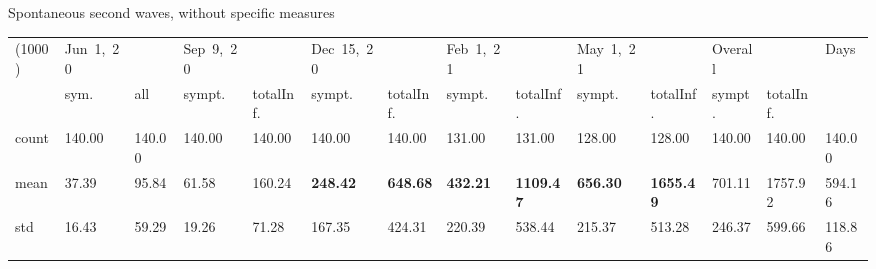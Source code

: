 \documentclass[8pt]{beamer}
\begin{document}
\begin{frame}{Spontaneous second waves, without specific measures}
\begin{table}[H]
\center
\tiny
\begin{tabular}{p{0.3cm}p{0.3cm}p{0.3cm}p{0.3cm}p{0.3cm}p{0.3cm}p{0.3cm}p{0.3cm}p{0.3cm}p{0.3cm}p{0.3cm}p{0.3cm}p{0.3cm}p{0.3cm}}
\toprule
(1000) &  Jun~1,~20 & &  Sep~9,~20 & & Dec~15,~20 & & Feb~1,~21 & & May~1,~21 & & Overall  & & Days \\
{} &  sym. &  all &  sympt. &  totalInf. &  sympt. &  totalInf. &  sympt. &  totalInf. &  sympt. &  totalInf. &  sympt. &  totalInf.  & \\
\midrule
count &   140.00 &                     140.00 &   140.00 &                     140.00 &   140.00 &                     140.00 &   131.00 &                     131.00 &   128.00 &                     128.00 &              140.00 &                  140.00 & 140.00 \\
mean  &    37.39 &                      95.84 &    61.58 &                     160.24 &   \textbf{248.42} &                     \textbf{648.68} &   \textbf{432.21 }&                    \textbf{1109.47} &   \textbf{656.30} &                    \textbf{1655.49} &              701.11 &                 1757.92 & 594.16 \\
std   &    16.43 &                      59.29 &    19.26 &                      71.28 &   167.35 &                     424.31 &   220.39 &                     538.44 &   215.37 &                     513.28 &              246.37 &                  599.66 & 118.86 \\
\bottomrule
\end{tabular}

\label{selSpontWave2Tab}
\end{table}


\end{frame}
\end{document}
